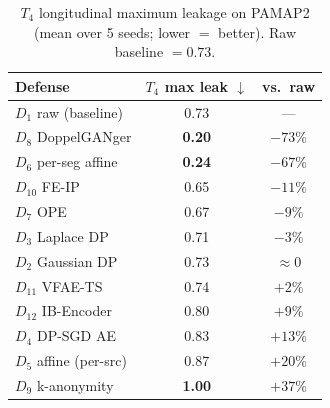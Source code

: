 \documentclass{article}
\theoremstyle{remark}
\begin{document}
\begin{table}[h]
\centering
\caption{$T_4$ longitudinal maximum leakage on PAMAP2 (mean over 5 seeds; lower $=$ better). Raw baseline $= 0.73$.}
\label{tab:t4}
\small
\begin{tabular}{@{}lcc@{}}
\toprule
Defense & $T_4$ max leak $\downarrow$ & vs.\ raw \\
\midrule
$D_1$ raw (baseline)         & 0.73 & --- \\
$D_8$ DoppelGANger           & \textbf{0.20} & $-73\%$ \\
$D_6$ per-seg affine         & \textbf{0.24} & $-67\%$ \\
$D_{10}$ FE-IP               & 0.65 & $-11\%$ \\
$D_7$ OPE                    & 0.67 & $-9\%$ \\
$D_3$ Laplace DP             & 0.71 & $-3\%$ \\
$D_2$ Gaussian DP            & 0.73 & $\approx 0$ \\
$D_{11}$ VFAE-TS             & 0.74 & \emph{$+2\%$} \\
$D_{12}$ IB-Encoder          & 0.80 & \emph{$+9\%$} \\
$D_4$ DP-SGD AE              & 0.83 & \emph{$+13\%$} \\
$D_5$ affine (per-src)       & 0.87 & \emph{$+20\%$} \\
$D_9$ k-anonymity            & \textbf{1.00} & \emph{$+37\%$} \\
\bottomrule
\end{tabular}
\end{table}
\end{document}
